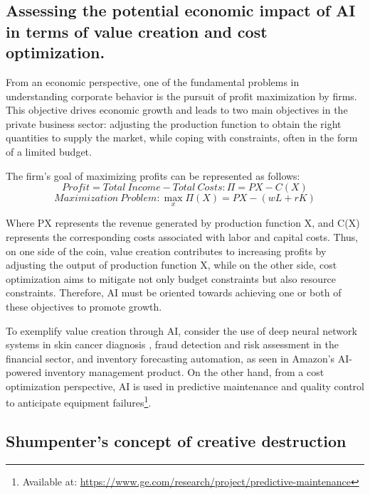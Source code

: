 \documentclass[preprint, 1p,
authoryear]{elsarticle} %
\begin{document}
\hypertarget{assessing-the-potential-economic-impact-of-ai-in-terms-of-value-creation-and-cost-optimization.}{%
\subsection{Assessing the potential economic impact of AI in terms of
value creation and cost
optimization.}\label{assessing-the-potential-economic-impact-of-ai-in-terms-of-value-creation-and-cost-optimization.}}

From an economic perspective, one of the fundamental problems in
understanding corporate behavior is the pursuit of profit maximization
by firms. This objective drives economic growth and leads to two main
objectives in the private business sector: adjusting the production
function to obtain the right quantities to supply the market, while
coping with constraints, often in the form of a limited budget.

The firm's goal of maximizing profits can be represented as follows: \[
Profit = Total \ Income - Total \ Costs: \Pi = PX - C(X)
\] \[
Maximization \ Problem: \max_{x} \Pi(X) = PX - (wL + rK)
\]

Where PX represents the revenue generated by production function X, and
C(X) represents the corresponding costs associated with labor and
capital costs. Thus, on one side of the coin, value creation contributes
to increasing profits by adjusting the output of production function X,
while on the other side, cost optimization aims to mitigate not only
budget constraints but also resource constraints. Therefore, AI must be
oriented towards achieving one or both of these objectives to promote
growth.

To exemplify value creation through AI, consider the use of deep neural
network systems in skin cancer diagnosis \citep{cancer}, fraud detection
and risk assessment in the financial sector, and inventory forecasting
automation, as seen in Amazon's AI-powered inventory management product.
On the other hand, from a cost optimization perspective, AI is used in
predictive maintenance and quality control to anticipate equipment
failures\footnote{Available at:
  \url{https://www.ge.com/research/project/predictive-maintenance}}.

\hypertarget{shumpenters-concept-of-creative-destruction}{%
\subsection{Shumpenter's concept of creative
destruction}\label{shumpenters-concept-of-creative-destruction}}
\end{document}
